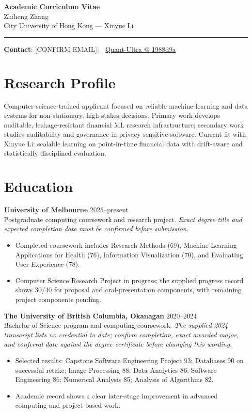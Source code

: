 \documentclass[11pt]{article}
\makeatletter
\newcommand{\ApplicantName}{Zhiheng Zhang}
\newcommand{\ApplicantEmail}{[CONFIRM EMAIL]}
\newcommand{\ApplicantPhone}{[CONFIRM PHONE]}
\newcommand{\ApplicantGitHub}{\href{https://github.com/zhiheng-zhang-Mera/Quant-Ultra/tree/1988d9a8530da91a8158de864d098ea869098923}{Quant-Ultra @ 1988d9a}}
\makeatother
\begin{document}
\begin{center}
{\LARGE\bfseries Academic Curriculum Vitae}\\[0.25em]
{\large \ApplicantName}\\
City University of Hong Kong --- Xinyue Li
\end{center}
\vspace{0.35em}\hrule\vspace{0.65em}

\textbf{Contact}: \ApplicantEmail\quad | \quad \ApplicantPhone\quad | \quad \ApplicantGitHub

\section*{Research Profile}
Computer-science-trained applicant focused on reliable machine-learning and data systems for non-stationary, high-stakes decisions. Primary work develops auditable, leakage-resistant financial ML research infrastructure; secondary work studies auditability and governance in privacy-sensitive software. Current fit with Xinyue Li: scalable learning on point-in-time financial data with drift-aware and statistically disciplined evaluation.

\section*{Education}
\textbf{University of Melbourne} \hfill 2025--present\\
Postgraduate computing coursework and research project. \textit{Exact degree title and expected completion date must be confirmed before submission.}
\begin{itemize}
\item Completed coursework includes Research Methods (69), Machine Learning Applications for Health (76), Information Visualization (70), and Evaluating User Experience (78).
\item Computer Science Research Project in progress; the supplied progress record shows 30/40 for proposal and oral-presentation components, with remaining project components pending.
\end{itemize}

\textbf{The University of British Columbia, Okanagan} \hfill 2020--2024\\
Bachelor of Science program and computing coursework. \textit{The supplied 2024 transcript lists no credential to date; confirm completion, exact awarded major, and conferral date against the degree certificate before changing this wording.}
\begin{itemize}
\item Selected results: Capstone Software Engineering Project 93; Databases 90 on successful retake; Image Processing 88; Data Analytics 86; Software Engineering 86; Numerical Analysis 85; Analysis of Algorithms 82.
\item Academic record shows a clear later-stage improvement in advanced computing and project-based work.
\end{itemize}
\end{document}
